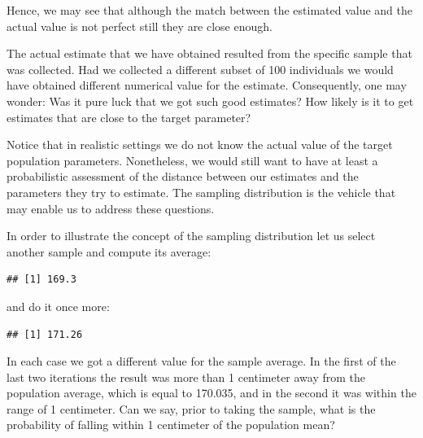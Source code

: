 \documentclass[
]{krantz}
\makeatletter
\newenvironment{Shaded}{\begin{snugshade}}{\end{snugshade}}
\newcommand{\DecValTok}[1]{\textcolor[rgb]{0.00,0.00,0.81}{#1}}
\newcommand{\FloatTok}[1]{\textcolor[rgb]{0.00,0.00,0.81}{#1}}
\newcommand{\KeywordTok}[1]{\textcolor[rgb]{0.13,0.29,0.53}{\textbf{#1}}}
\newcommand{\NormalTok}[1]{#1}
\newcommand{\OperatorTok}[1]{\textcolor[rgb]{0.81,0.36,0.00}{\textbf{#1}}}
\newcommand{\StringTok}[1]{\textcolor[rgb]{0.31,0.60,0.02}{#1}}
\newenvironment{kframe}{%
\medskip{}
\setlength{\fboxsep}{.8em}
 \def\at@end@of@kframe{}%
 \ifinner\ifhmode%
  \def\at@end@of@kframe{\end{minipage}}%
  \begin{minipage}{\columnwidth}%
 \fi\fi%
 \def\FrameCommand##1{\hskip\@totalleftmargin \hskip-\fboxsep
 \colorbox{shadecolor}{##1}\hskip-\fboxsep
     \hskip-\linewidth \hskip-\@totalleftmargin \hskip\columnwidth}%
 \MakeFramed {\advance\hsize-\width
   \@totalleftmargin\z@ \linewidth\hsize
   \@setminipage}}%
 {\par\unskip\endMakeFramed%
 \at@end@of@kframe}
\renewenvironment{Shaded}{\begin{kframe}}{\end{kframe}}
\theoremstyle{definition}
\theoremstyle{definition}
\theoremstyle{definition}
\theoremstyle{remark}
\makeatother
\begin{document}
Hence, we may see that although the match between the estimated value
and the actual value is not perfect still they are close enough.

The actual estimate that we have obtained resulted from the specific
sample that was collected. Had we collected a different subset of 100
individuals we would have obtained different numerical value for the
estimate. Consequently, one may wonder: Was it pure luck that we got
such good estimates? How likely is it to get estimates that are close to
the target parameter?

Notice that in realistic settings we do not know the actual value of the
target population parameters. Nonetheless, we would still want to have
at least a probabilistic assessment of the distance between our
estimates and the parameters they try to estimate. The sampling
distribution is the vehicle that may enable us to address these
questions.

In order to illustrate the concept of the sampling distribution let us
select another sample and compute its average:

\begin{Shaded}
\end{Shaded}

\begin{verbatim}
## [1] 169.3
\end{verbatim}

and do it once more:

\begin{Shaded}
\end{Shaded}

\begin{verbatim}
## [1] 171.26
\end{verbatim}

In each case we got a different value for the sample average. In the
first of the last two iterations the result was more than 1 centimeter
away from the population average, which is equal to 170.035, and in the
second it was within the range of 1 centimeter. Can we say, prior to
taking the sample, what is the probability of falling within 1
centimeter of the population mean?
\end{document}
